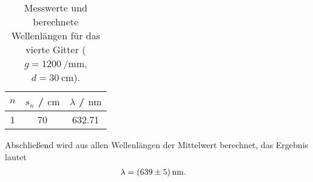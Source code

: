 \begin{table}[H]
  \centering
  \begin{tabular}{c|c|c}
    $n$ & $s_n$ / $\unit{\centi\metre}$& $\lambda$ / $\unit{\nano\metre}$ \\
    \hline
    1 & 70 & 632.71 \\
  \end{tabular}
  \caption{Messwerte und berechnete Wellenlängen für das vierte Gitter ($g=\qty{1200}{\per\milli\metre}$, $d=\qty{30}{\centi\metre}$).}
\label{tab:lambda4}
\end{table}
Abschließend wird aus allen Wellenlängen der Mittelwert berechnet, das Ergebnis lautet
\begin{align*}
  \lambda &=\qty{639+-5}{\nano\metre}.
\end{align*}